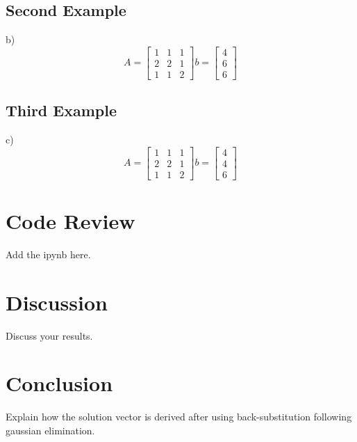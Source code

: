 \documentclass{article}
\begin{document}
 
        \subsection{Second Example}              
        b)
    	$$
    	A =  \begin{bmatrix}1&1&1\\2&2&1\\1&1&2\end{bmatrix} 
b =   \begin{bmatrix}4\\6\\6\end{bmatrix} 
    	$$    

        \subsection{Third Example}
        c)
    	$$
    	A =  \begin{bmatrix}1&1&1\\2&2&1\\1&1&2\end{bmatrix} 
b =   \begin{bmatrix}4\\4\\6\end{bmatrix} 
    	$$              
 
    \section{Code Review} 
    Add the ipynb here.                    

    \section{Discussion}   
    Discuss your results.

    \section{Conclusion}
    Explain how the solution vector is derived after using back-substitution following gaussian elimination.
\end{document}
